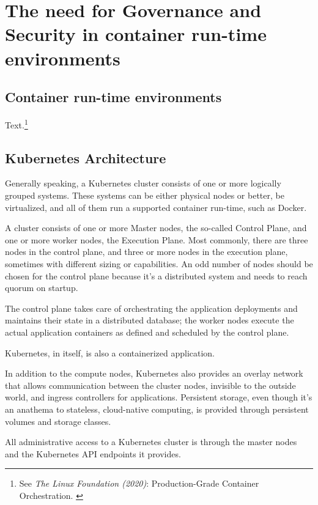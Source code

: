 %
%

\pagebreak
\section{The need for Governance and Security in container run-time environments}

\onehalfspacing

\subsection{Container run-time environments}

Text.\footnote{See \textit{The Linux Foundation (2020)}: Production-Grade Container Orchestration. \cite{kubernetes}}

\subsection{Kubernetes Architecture}

Generally speaking, a Kubernetes cluster consists of one or more logically grouped systems. These systems can be either physical nodes or better, be virtualized, and all of them run a supported container run-time, such as Docker.

A cluster consists of one or more Master nodes, the so-called Control Plane, and one or more worker nodes, the Execution Plane. Most commonly, there are three nodes in the control plane, and three or more nodes in the execution plane, sometimes with different sizing or capabilities. An odd number of nodes should be chosen for the control plane because it's a distributed system and needs to reach quorum on startup.

The control plane takes care of orchestrating the application deployments and maintains their state in a distributed database; the worker nodes execute the actual application containers as defined and scheduled by the control plane.

Kubernetes, in itself, is also a containerized application.

In addition to the compute nodes, Kubernetes also provides an overlay network that allows communication between the cluster nodes, invisible to the outside world, and ingress controllers for applications. Persistent storage, even though it's an anathema to stateless, cloud-native computing, is provided through persistent volumes and storage classes.

All administrative access to a Kubernetes cluster is through the master nodes and the Kubernetes API endpoints it provides.

